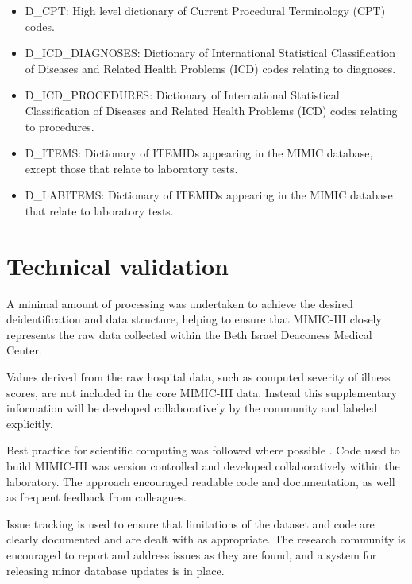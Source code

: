 \documentclass[english]{article}
\begin{document}
\begin{itemize}
  \item D\_CPT: High level dictionary of Current Procedural Terminology (CPT) codes.
  \item D\_ICD\_DIAGNOSES: Dictionary of International Statistical Classification of Diseases and Related Health Problems (ICD) codes relating to diagnoses.
  \item D\_ICD\_PROCEDURES: Dictionary of International Statistical Classification of Diseases and Related Health Problems (ICD) codes relating to procedures.
  \item D\_ITEMS: Dictionary of ITEMIDs appearing in the MIMIC database, except those that relate to laboratory tests.
  \item D\_LABITEMS: Dictionary of ITEMIDs appearing in the MIMIC database that relate to laboratory tests.
\end{itemize}


\section*{Technical validation}


A minimal amount of processing was undertaken to achieve the desired deidentification and data structure, helping to ensure that MIMIC-III closely represents the raw data collected within the Beth Israel Deaconess Medical Center.

Values derived from the raw hospital data, such as computed severity of illness scores, are not included in the core MIMIC-III data. Instead this supplementary information will be developed collaboratively by the community and labeled explicitly.

Best practice for scientific computing was followed where possible \cite{cite4}. Code used to build MIMIC-III was version controlled and developed collaboratively within the laboratory. The approach encouraged readable code and documentation, as well as frequent feedback from colleagues.

Issue tracking is used to ensure that limitations of the dataset and code are clearly documented and are dealt with as appropriate. The research community is encouraged to report and address issues as they are found, and a system for releasing minor database updates is in place.
\end{document}
